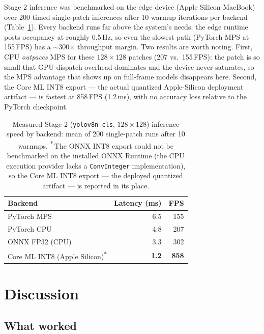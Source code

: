 \documentclass[10pt,twocolumn,letterpaper]{article}
\begin{document}
Stage 2 inference was benchmarked on the edge device (Apple Silicon
MacBook) over 200 timed single-patch inferences after 10 warmup
iterations per backend (Table~\ref{tab:speed}). Every backend runs far
above the system's needs: the edge runtime posts occupancy at roughly
0.5\,Hz, so even the slowest path (PyTorch MPS at 155\,FPS) has a
$\sim$300$\times$ throughput margin. Two results are worth noting. First,
CPU \emph{outpaces} MPS for these $128\times128$ patches (207 vs.\
155\,FPS): the patch is so small that GPU dispatch overhead dominates and
the device never saturates, so the MPS advantage that shows up on
full-frame models disappears here. Second, the Core ML INT8 export --- the
actual quantized Apple-Silicon deployment artifact --- is fastest at
858\,FPS (1.2\,ms), with no accuracy loss relative to the PyTorch
checkpoint.

\begin{table}[tbp]
\centering\footnotesize
\setlength{\tabcolsep}{4pt}
\begin{tabular}{lrr}
\toprule
\textbf{Backend} & \textbf{Latency (ms)} & \textbf{FPS} \\
\midrule
PyTorch MPS                     & 6.5 & 155 \\
PyTorch CPU                     & 4.8 & 207 \\
ONNX FP32 (CPU)                 & 3.3 & 302 \\
Core ML INT8 (Apple Silicon)\textsuperscript{$\ast$} & \textbf{1.2} & \textbf{858} \\
\bottomrule
\end{tabular}
\caption{Measured Stage 2 (\texttt{yolov8n-cls}, $128\times128$)
inference speed by backend: mean of 200 single-patch runs after 10
warmups. \textsuperscript{$\ast$}\,The ONNX INT8 export could not be
benchmarked on the installed ONNX Runtime (the CPU execution provider
lacks a \texttt{ConvInteger} implementation), so the Core ML INT8 export
--- the deployed quantized artifact --- is reported in its place.}
\label{tab:speed}
\end{table}

\section{Discussion}
\label{sec:discussion}

\subsection{What worked}
\end{document}
